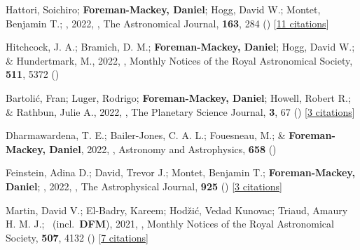 \item[{\color{numcolor}\scriptsize79}] Hattori, Soichiro; \textbf{Foreman-Mackey, Daniel}; Hogg, David W.; Montet, Benjamin T.; \etal, 2022, , The Astronomical Journal, \textbf{163}, 284 () [\href{https://ui.adsabs.harvard.edu/abs/2022AJ....163..284H}{11 citations}]

\item[{\color{numcolor}\scriptsize78}] Hitchcock, J. A.; Bramich, D. M.; \textbf{Foreman-Mackey, Daniel}; Hogg, David W.; \& Hundertmark, M., 2022, , Monthly Notices of the Royal Astronomical Society, \textbf{511}, 5372 ()

\item[{\color{numcolor}\scriptsize77}] Bartoli{\'c}, Fran; Luger, Rodrigo; \textbf{Foreman-Mackey, Daniel}; Howell, Robert R.; \& Rathbun, Julie A., 2022, , The Planetary Science Journal, \textbf{3}, 67 () [\href{https://ui.adsabs.harvard.edu/abs/2022PSJ.....3...67B}{3 citations}]

\item[{\color{numcolor}\scriptsize76}] Dharmawardena, T. E.; Bailer-Jones, C. A. L.; Fouesneau, M.; \& \textbf{Foreman-Mackey, Daniel}, 2022, , Astronomy and Astrophysics, \textbf{658} ()

\item[{\color{numcolor}\scriptsize75}] Feinstein, Adina D.; David, Trevor J.; Montet, Benjamin T.; \textbf{Foreman-Mackey, Daniel}; \etal, 2022, , The Astrophysical Journal, \textbf{925} () [\href{https://ui.adsabs.harvard.edu/abs/2022ApJ...925L...2F}{3 citations}]

\item[{\color{numcolor}\scriptsize74}] Martin, David V.; El-Badry, Kareem; Hod{\v{z}}i{\'c}, Vedad Kunovac; Triaud, Amaury H. M. J.; \etal\ (incl.\ \textbf{DFM}), 2021, , Monthly Notices of the Royal Astronomical Society, \textbf{507}, 4132 () [\href{https://ui.adsabs.harvard.edu/abs/2021MNRAS.507.4132M}{7 citations}]

